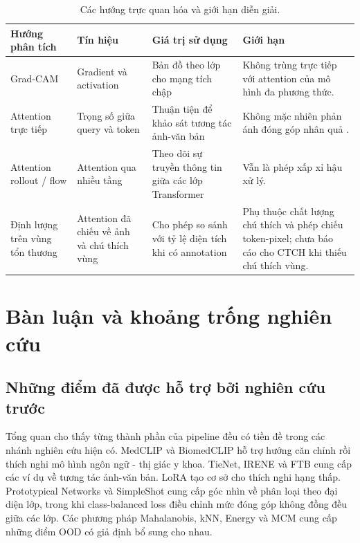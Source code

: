 \begin{table}[htbp]
\centering
\small
\renewcommand{\arraystretch}{1.2}
\begin{tabularx}{\textwidth}{L{2.5cm} L{2.7cm} X X}
\toprule
\textbf{Hướng phân tích} & \textbf{Tín hiệu} & \textbf{Giá trị sử dụng} & \textbf{Giới hạn} \\
\midrule
Grad-CAM \cite{Selvaraju2017GradCAM} & Gradient và activation & Bản đồ theo lớp cho mạng tích chập & Không trùng trực tiếp với attention của mô hình đa phương thức. \\
\addlinespace
Attention trực tiếp & Trọng số giữa query và token & Thuận tiện để khảo sát tương tác ảnh-văn bản & Không mặc nhiên phản ánh đóng góp nhân quả \cite{Jain2019AttentionNotExplanation}. \\
\addlinespace
Attention rollout / flow \cite{Abnar2020AttentionFlow} & Attention qua nhiều tầng & Theo dõi sự truyền thông tin giữa các lớp Transformer & Vẫn là phép xấp xỉ hậu xử lý. \\
\addlinespace
Định lượng trên vùng tổn thương & Attention đã chiếu về ảnh và chú thích vùng & Cho phép so sánh với tỷ lệ diện tích khi có annotation & Phụ thuộc chất lượng chú thích và phép chiếu token-pixel; chưa báo cáo cho CTCH khi thiếu chú thích vùng. \\
\bottomrule
\end{tabularx}
\caption{Các hướng trực quan hóa và giới hạn diễn giải.}
\label{tab:ch2_explainability}
\end{table}

\section{Bàn luận và khoảng trống nghiên cứu}

\subsection{Những điểm đã được hỗ trợ bởi nghiên cứu trước}

Tổng quan cho thấy từng thành phần của pipeline đều có tiền đề trong các nhánh nghiên cứu hiện có. MedCLIP và BiomedCLIP hỗ trợ hướng căn chỉnh rồi thích nghi mô hình ngôn ngữ - thị giác y khoa. TieNet, IRENE và FTB cung cấp các ví dụ về tương tác ảnh-văn bản. LoRA tạo cơ sở cho thích nghi hạng thấp. Prototypical Networks và SimpleShot cung cấp góc nhìn về phân loại theo đại diện lớp, trong khi class-balanced loss điều chỉnh mức đóng góp không đồng đều giữa các lớp. Các phương pháp Mahalanobis, kNN, Energy và MCM cung cấp những điểm OOD có giả định bổ sung cho nhau.

